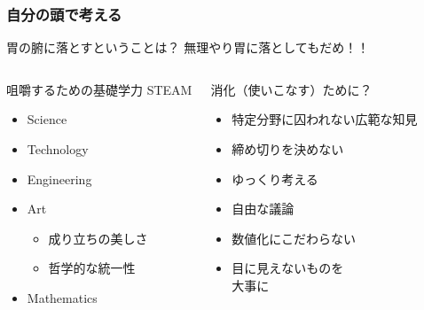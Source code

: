\documentclass[12pt, dvipdfmx]{beamer}
\begin{document}
\begin{frame}
    \frametitle{自分の頭で考える}
        \begin{alertblock}{胃の腑に落とすということは？}
            無理やり胃に落としてもだめ！！
        \end{alertblock}
        \begin{columns}[T, onlytextwidth]
            
            \vspace{-3mm}
            \begin{block}{咀嚼するための基礎学力}
                STEAM 
                \begin{itemize}
                    \item Science
                    \item Technology
                    \item Engineering
                    \item \alert{Art}
                    \begin{itemize}
                        \item 成り立ちの美しさ
                        \item 哲学的な統一性 
                    \end{itemize}
                    \item Mathematics
                \end{itemize}
            \end{block}
            
            \vspace{-3mm}
            \begin{exampleblock}{消化（使いこなす）ために？}
                \begin{itemize}
                    \item 特定分野に囚われない広範な知見
                    \item 締め切りを決めない
                    \item ゆっくり考える
                    \item 自由な議論
                    \item 数値化にこだわらない
                    \item 目に見えないものを\\大事に
                \end{itemize}
            \end{exampleblock}
        \end{columns}
\end{frame}
\end{document}
